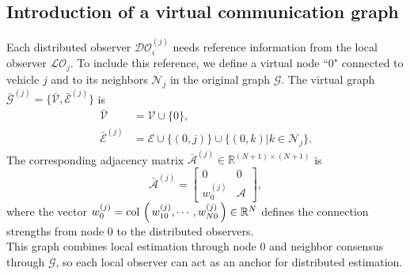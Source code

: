 \documentclass{ifacconf}
\def\col#1{\mathop{{\rm col}\,\left(\,#1\,\right)}}
\def\V{\mathcal{V}} %
\def\E{\mathcal{E}} %
\def\G{\mathcal{G}} %
\def\A{\mathcal{A}} %
\def\N{\mathcal{N}} %
\def\LO{\mathcal{LO}} %
\def\DO{\mathcal{DO}} %
\newtheorem{remark}{\it \textbf{Remark}}%
\begin{document}
\subsection{Introduction of a virtual communication graph}
\vspace*{-0.3cm}
Each distributed observer $\DO_{i}^{(j)}$ needs reference information from the local observer $\LO_{j}$.
    To include this reference, we define a virtual node ``0" connected to vehicle $j$ and to its neighbors $\N_{j}$ in the original graph $\G$. 
    The virtual graph $\bar{\G}^{(j)} = \{ \bar{\V}, \bar{\E}^{(j)} \}$ is
    \begin{equation}
        \begin{aligned}
            \bar{\V} &= \V \cup \{0\}, \\
            \bar{\E}^{(j)} &= \E \cup \{ (0,j) \} \cup \{ (0,k) | k \in \N_{j} \}.
        \end{aligned}
    \end{equation}
    The corresponding adjacency matrix $\bar{\A}^{(j)}  \in \mathbb{R}^{(N+1) \times (N+1)}$ is
    \begin{equation}
        \bar{\A}^{(j)}  = \begin{bmatrix} 0 & 0 \\
                        w_{0}^{(j)} & \A \end{bmatrix},
    \end{equation}  
    where the vector $w_{0}^{(j)} = \col{w_{10}^{(j)}, \cdots, w_{N0}^{(j)}}  \in \mathbb{R}^{N}$ defines the connection strengths from node $0$ to the distributed observers.
    \\
    This graph combines local estimation through node $0$ and neighbor consensus through $\G$, so each local observer can act as an anchor for distributed estimation.
\end{document}
